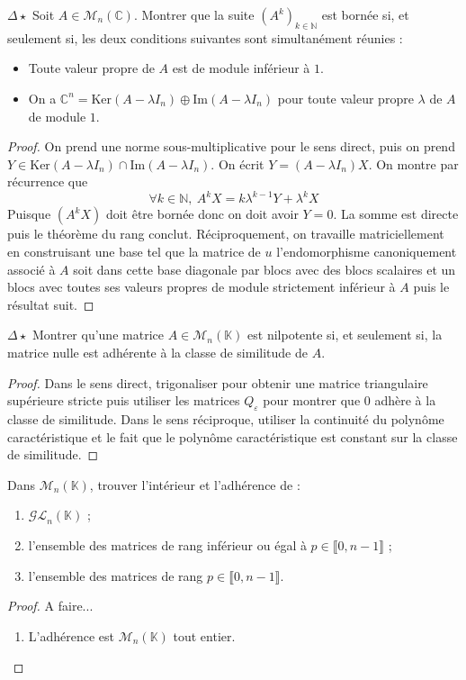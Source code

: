 \documentclass[french,a4paper]{article}
\newcommand{\N}{\mathbb{N}}
\newcommand{\C}{\mathbb{C}}
\newcommand{\K}{\mathbb{K}}
\renewcommand{\ker}{\text{Ker}}
\newcommand{\im}{\text{Im}}
\theoremstyle{plain}
\theoremstyle{definition}
\theoremstyle{remark}
\begin{document}
\begin{ex}{$\Delta\star$}
	Soit $A\in\mathcal{M}_n(\C)$. Montrer que la suite $(A^k)_{k\in\N}$ est bornée si, et seulement si, les deux conditions suivantes sont simultanément réunies : 
	\begin{itemize}
		\item Toute valeur propre de $A$ est de module inférieur à $1$.
		\item On a $\C^n=\ker(A-\lambda I_n)\oplus\im(A-\lambda I_n)$ pour toute valeur propre $\lambda$ de $A$ de module $1$.
	\end{itemize}
\end{ex}
\begin{proof}
	On prend une norme sous-multiplicative pour le sens direct, puis on prend $Y\in\ker(A-\lambda I_n)\cap\im(A-\lambda I_n)$. On écrit $Y=(A-\lambda I_n)X$. On montre par récurrence que $$\forall k\in\N,\ A^kX=k\lambda^{k-1}Y+\lambda^k X$$ Puisque $(A^kX)$ doit être bornée donc on doit avoir $Y=0$. La somme est directe puis le théorème du rang conclut. Réciproquement, on travaille matriciellement en construisant une base tel que la matrice de $u$ l'endomorphisme canoniquement associé à $A$ soit dans cette base diagonale par blocs avec des blocs scalaires et un blocs avec toutes ses valeurs propres de module strictement inférieur à $A$ puis le résultat suit.
\end{proof}

\begin{ex}{$\Delta\star$}
	Montrer qu'une matrice $A\in\mathcal{M}_n(\K)$ est nilpotente si, et seulement si, la matrice nulle est adhérente à la classe de similitude de $A$.
\end{ex}
\begin{proof}
	Dans le sens direct, trigonaliser pour obtenir une matrice triangulaire supérieure stricte puis utiliser les matrices $Q_\varepsilon$ pour montrer que $0$ adhère à la classe de similitude. Dans le sens réciproque, utiliser la continuité du polynôme caractéristique et le fait que le polynôme caractéristique est constant sur la classe de similitude.
\end{proof}

\begin{ex}{}
	Dans $\mathcal{M}_n(\K)$, trouver l'intérieur et l'adhérence de :
	\begin{enumerate}
		\item $\mathcal{GL}_n(\K)$ ;
		\item l'ensemble des matrices de rang inférieur ou égal à $p\in\llbracket0,n-1\rrbracket$ ;
		\item l'ensemble des matrices de rang $p\in\llbracket0,n-1\rrbracket$.
	\end{enumerate}
\end{ex}
\begin{proof}
	A faire...
	\begin{enumerate}
		\item L'adhérence est $\mathcal{M}_n(\K)$ tout entier.
	\end{enumerate}
\end{proof}
\end{document}
